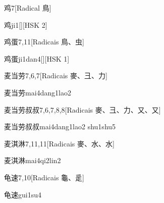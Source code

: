 \begin{entry}{鸡}{7}[Radical ⿃]
  \begin{phonetics}{鸡}{ji1}[][HSK 2]
  \end{phonetics}
\end{entry}

\begin{entry}{鸡蛋}{7,11}[Radicais ⿃、⾍]
  \begin{phonetics}{鸡蛋}{ji1dan4}[][HSK 1]
  \end{phonetics}
\end{entry}

\begin{entry}{麦当劳}{7,6,7}[Radicais ⿆、⼹、⼒]
  \begin{phonetics}{麦当劳}{mai4dang1lao2}
  \end{phonetics}
\end{entry}

\begin{entry}{麦当劳叔叔}{7,6,7,8,8}[Radicais ⿆、⼹、⼒、⼜、⼜]
  \begin{phonetics}{麦当劳叔叔}{mai4dang1lao2 shu1shu5}
  \end{phonetics}
\end{entry}

\begin{entry}{麦淇淋}{7,11,11}[Radicais ⿆、⽔、⽔]
  \begin{phonetics}{麦淇淋}{mai4qi2lin2}
  \end{phonetics}
\end{entry}

\begin{entry}{龟速}{7,10}[Radicais ⿔、⾡]
  \begin{phonetics}{龟速}{gui1su4}
  \end{phonetics}
\end{entry}


